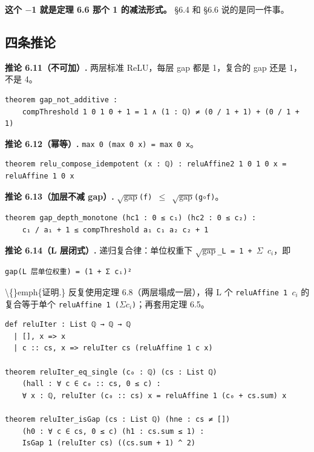 \documentclass[11pt,a4paper]{ctexart}
\begin{document}
\textbf{这个 \ensuremath{-}1 就是定理 6.6 那个 1 的减法形式。} §6.4 和 §6.6 说的是同一件事。

\subsection{四条推论}

\textbf{推论 6.11（不可加）.} 两层标准 ReLU，每层 gap 都是 1，复合的 gap 还是 1，不是 4。

\begin{lstlisting}
theorem gap_not_additive :
    compThreshold 1 0 1 0 + 1 = 1 ∧ (1 : ℚ) ≠ (0 / 1 + 1) + (0 / 1 + 1)
\end{lstlisting}

\textbf{推论 6.12（幂等）.} \texttt{max 0 (max 0 x) = max 0 x}。

\begin{lstlisting}
theorem relu_compose_idempotent (x : ℚ) : reluAffine2 1 0 1 0 x = reluAffine 1 0 x
\end{lstlisting}

\textbf{推论 6.13（加层不减 gap）.} \texttt{\ensuremath{\sqrt{\mathrm{gap}}}(f) \ensuremath{\le} \ensuremath{\sqrt{\mathrm{gap}}}(g\ensuremath{\circ}f)}。

\begin{lstlisting}
theorem gap_depth_monotone (hc1 : 0 ≤ c₁) (hc2 : 0 ≤ c₂) :
    c₁ / a₁ + 1 ≤ compThreshold a₁ c₁ a₂ c₂ + 1
\end{lstlisting}

\textbf{推论 6.14（L 层闭式）.} 递归复合律：单位权重下 \texttt{\ensuremath{\sqrt{\mathrm{gap}}}\_L = 1 + \ensuremath{\Sigma} \ensuremath{c_{i}}}，即

\begin{lstlisting}
gap(L 层单位权重) = (1 + Σ cᵢ)²
\end{lstlisting}

\textbackslash\{\}emph\{证明.\} 反复使用定理 6.8（两层塌成一层），得 L 个 \texttt{reluAffine 1 \ensuremath{c_{i}}} 的复合等于单个 \texttt{reluAffine 1 (\ensuremath{\Sigma}\ensuremath{c_{i}})}；再套用定理 6.5。

\begin{lstlisting}
def reluIter : List ℚ → ℚ → ℚ
  | [], x => x
  | c :: cs, x => reluIter cs (reluAffine 1 c x)

theorem reluIter_eq_single (c₀ : ℚ) (cs : List ℚ)
    (hall : ∀ c ∈ c₀ :: cs, 0 ≤ c) :
    ∀ x : ℚ, reluIter (c₀ :: cs) x = reluAffine 1 (c₀ + cs.sum) x

theorem reluIter_isGap (cs : List ℚ) (hne : cs ≠ [])
    (h0 : ∀ c ∈ cs, 0 ≤ c) (h1 : cs.sum ≤ 1) :
    IsGap 1 (reluIter cs) ((cs.sum + 1) ^ 2)
\end{lstlisting}
\end{document}
